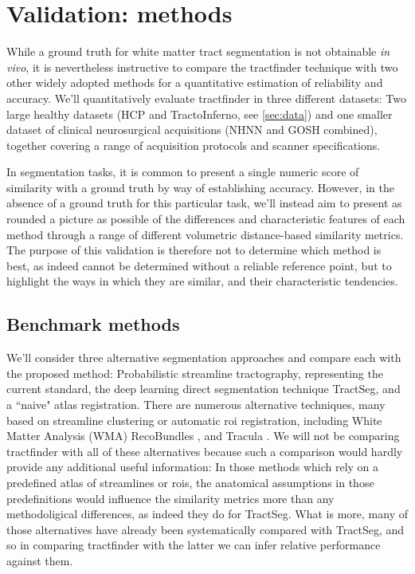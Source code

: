 
\section{Validation: methods}

While a ground truth for white matter tract segmentation is not obtainable \textit{in vivo}, it is nevertheless instructive to compare the tractfinder technique with two other widely adopted methods for a quantitative estimation of reliability and accuracy.
We'll quantitatively evaluate tractfinder in three different datasets: Two large healthy datasets (HCP and TractoInferno, see \ref{sec:data}) and one smaller dataset of clinical neurosurgical acquisitions (NHNN and GOSH combined), together covering a range of acquisition protocols and scanner specifications.

In segmentation tasks, it is common to present a single numeric score of similarity with a ground truth by way of establishing accuracy.
However, in the absence of a ground truth for this particular task, we'll instead aim to present as rounded a picture as possible of the differences and characteristic features of each method through a range of different volumetric distance-based similarity metrics.
The purpose of this validation is therefore not to determine which method is best, as indeed cannot be determined without a reliable reference point, but to highlight the ways in which they are similar, and their characteristic tendencies.

\subsection{Benchmark methods}

We'll consider three alternative segmentation approaches and compare each with the proposed method: Probabilistic streamline tractography, representing the current standard, the deep learning direct segmentation technique TractSeg, and a ``naive" atlas registration.
There are numerous alternative techniques, many based on streamline clustering or automatic \gls{roi} registration, including White Matter Analysis (WMA)\autocite{ODonnell2017} RecoBundles \autocite{Garyfallidis2018}, and Tracula .
We will not be comparing tractfinder with all of these alternatives because such a comparison would hardly provide any additional useful information:
In those methods which rely on a predefined atlas of streamlines or \glspl{roi}, the anatomical assumptions  in those predefinitions would influence the similarity metrics more than any methodoligical differences, as indeed they do for TractSeg.
What is more, many of those alternatives have already been systematically compared with TractSeg\autocite{Wasserthal2018}, and so in comparing tractfinder with the latter we can infer relative performance against them.

